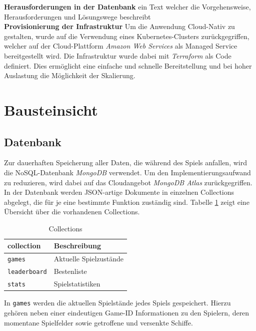 \documentclass[a4paper, 10pt, conference]{IEEEtran}
\begin{document}
\textbf{Herausforderungen in der Datenbank} 
ein Text welcher die Vorgehensweise, Herausforderungen und Lösungswege beschreibt\\
\textbf{Provisionierung der Infrastruktur} 
Um die Anwendung Cloud-Nativ zu gestalten, wurde auf die Verwendung eines Kubernetes-Clusters zurückgegriffen, welcher auf der Cloud-Plattform \textit{Amazon Web Services} als Managed Service bereitgestellt wird. Die Infrastruktur wurde dabei mit \textit{Terraform} als Code definiert. Dies ermöglicht eine einfache und schnelle Bereitstellung und bei hoher Auslastung die Möglichkeit der Skalierung.\\

\section{Bausteinsicht}\label{sec:bausteinsicht}



\subsection{Datenbank}\label{subsec:datenbank}
Zur dauerhaften Speicherung aller Daten, die während des Spiels anfallen, wird die NoSQL-Datenbank \textit{MongoDB} verwendet. Um den Implementierungsaufwand zu reduzieren, wird dabei auf das Cloudangebot \textit{MongoDB Atlas} zurückgegriffen. In der Datenbank werden JSON-artige Dokumente in einzelnen Collections abgelegt, die für je eine bestimmte Funktion zuständig sind. Tabelle \ref{tab:collections} zeigt eine Übersicht über die vorhandenen Collections.

\begin{table}[h!]
    \begin{center}
        \caption{Collections}
        \label{tab:collections}
        \begin{tabular}{|l|l|}
            \textbf{collection} & \textbf{Beschreibung}\\
            \hline
            \texttt{games}				& Aktuelle Spielzustände\\
            \texttt{leaderboard}					& Bestenliste\\
            \texttt{stats}	& Spielstatistiken\\
        \end{tabular}
    \end{center}
\end{table}

In \texttt{games} werden die aktuellen Spielstände jedes Spiels gespeichert. Hierzu gehören neben einer eindeutigen Game-ID Informationen zu den Spielern, deren momentane Spielfelder sowie getroffene und versenkte Schiffe.
\end{document}
